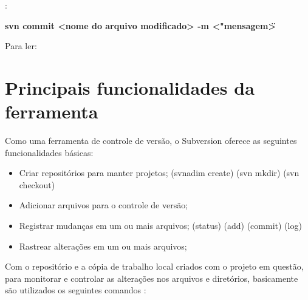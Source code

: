\begin{multicols}{2} 


:{

\colorbox{PineGreen}{
\begin{minipage}{210px}
  \textbf{svn commit <nome do arquivo modificado> -m <"mensagem\">}
\end{minipage}
}
}

Para ler:

\colorbox{PineGreen}{
\begin{minipage}{100px}
\end{minipage}
}

\end{multicols}

\section{Principais funcionalidades da ferramenta}

Como uma ferramenta de controle de versão, o Subversion oferece as seguintes funcionalidades básicas: 

\begin{itemize}
 \item Criar repositórios para manter projetos; (svnadim create) (svn mkdir) (svn checkout)
 \item Adicionar arquivos para o controle de versão; 
 \item Registrar mudanças em um ou mais arquivos; (status) (add) (commit) (log)
 \item Rastrear alterações em um ou mais arquivos;
\end{itemize}

Com o repositório e a cópia de trabalho local criados com o projeto em questão, para monitorar e controlar as
alterações nos arquivos e diretórios, basicamente são utilizados os seguintes comandos \cite{svn-book}:

